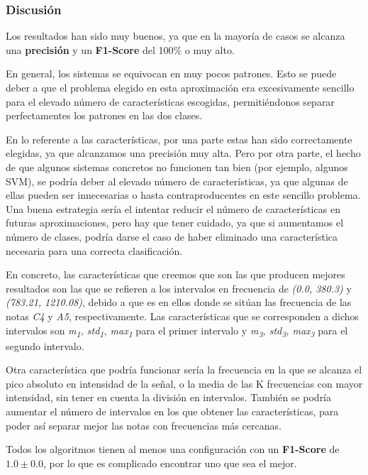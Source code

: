 \documentclass[12pt]{article}
\begin{document}
\subsubsection{Discusión}
Los resultados han sido muy buenos, ya que en la mayoría de casos se alcanza una \textbf{precisión} y un \textbf{F1-Score} del 100\% o muy alto. 

\bigskip
En general, los sistemas se equivocan en muy pocos patrones. Esto se puede deber a que el problema elegido en esta aproximación
era excesivamente sencillo para el elevado número de características escogidas, permitiéndonos separar perfectamentes los patrones
en las dos clases.

\bigskip
En lo referente a las características, por una parte estas han sido correctamente elegidas, ya que alcanzamos una precisión muy alta. Pero 
por otra parte, el hecho de que algunos sistemas concretos no 
funcionen tan bien (por ejemplo, algunos SVM), se podría deber al elevado número de características, 
ya que algunas de ellas pueden ser innecesarias o hasta contraproducentes en este sencillo problema. Una buena estrategia sería el intentar 
reducir el número de características en futuras aproximaciones, pero hay que tener cuidado, ya que si aumentamos el número de clases, 
podría darse el caso de haber eliminado una característica necesaria para una correcta clasificación.

En concreto, las características que creemos que son las que producen mejores resultados son las que se refieren a los intervalos 
en frecuencia de \textit{(0.0, 380.3)} y \textit{(783.21, 1210.08)}, debido a que es en ellos donde se sitúan las frecuencia de las notas 
\textit{C4} y \textit{A5}, respectivamente.
Las características que se corresponden a dichos intervalos son \textit{m\textsubscript{1}, std\textsubscript{1}, max\textsubscript{1}}
para el primer intervalo y \textit{m\textsubscript{3}, std\textsubscript{3}, max\textsubscript{3}} para el segundo intervalo.

Otra característica que podría funcionar sería la frecuencia en la que se alcanza el pico absoluto en intensidad de la señal,
o la media de las K frecuencias con mayor intensidad, sin tener en cuenta la división en intervalos. También se podría aumentar
el número de intervalos en los que obtener las características, para poder así separar mejor las notas con frecuencias más cercanas.

\bigskip
Todos los algoritmos tienen al menos una configuración con un \textbf{F1-Score} de $1.0 \pm 0.0$, por lo que es complicado encontrar uno que sea el mejor.
\end{document}
